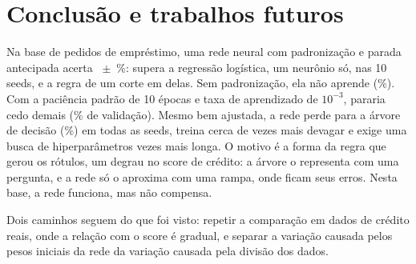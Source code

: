 \section{Conclusão e trabalhos futuros}

Na base de \rnLinhas{} pedidos de empréstimo, uma rede neural com padronização e parada antecipada acerta \rnAccRede~$\pm$~\rnSdRede\%: supera a regressão logística, um neurônio só, nas 10 seeds, e a regra de um corte em \rnSeedsRedeRegra{} delas. Sem padronização, ela não aprende (\rnSemPadAcc\%). Com a paciência padrão de 10 épocas e taxa de aprendizado de $10^{-3}$, pararia cedo demais (\rnParadaAccLentaDez\% de validação). Mesmo bem ajustada, a rede perde para a árvore de decisão (\rnAccArv\%) em todas as seeds, treina cerca de \rnRazaoTreino{} vezes mais devagar e exige uma busca de hiperparâmetros \rnRazaoBusca{} vezes mais longa. O motivo é a forma da regra que gerou os rótulos, um degrau no score de crédito: a árvore o representa com uma pergunta, e a rede só o aproxima com uma rampa, onde ficam seus erros. Nesta base, a rede funciona, mas não compensa.

Dois caminhos seguem do que foi visto: repetir a comparação em dados de crédito reais, onde a relação com o score é gradual, e separar a variação causada pelos pesos iniciais da rede da variação causada pela divisão dos dados.
